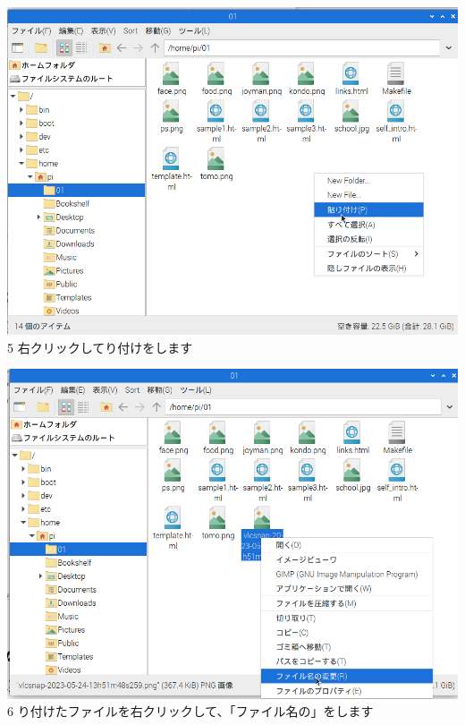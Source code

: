 \bigskip


\bigskip


\bigskip

\centering
\begin{minipage}{0.45\linewidth}
  \includegraphics[width=\linewidth]{text01-img/textbook-img168.png}\\
  5 右クリックしてり付けをします
\end{minipage}
\hfill
\vspace{20pt}
\begin{minipage}{0.45\linewidth}
  \includegraphics[width=\linewidth]{text01-img/textbook-img169.png}\\
  6 り付けたファイルを右クリックして、「ファイル名の」をします
\end{minipage}
